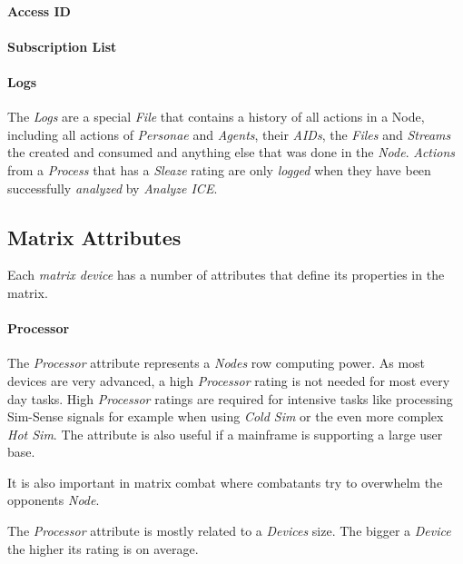\paragraph{Access ID}

\paragraph{Subscription List}

\paragraph{Logs}

The \emph{Logs} are a special \emph{File} that contains a history of all
actions in a Node, including all actions of \emph{Personae} and \emph{Agents},
their \emph{AIDs}, the \emph{Files} and \emph{Streams} the created and consumed
and anything else that was done in the \emph{Node}. \emph{Actions} from a
\emph{Process} that has a \emph{Sleaze} rating are only \emph{logged} when
they have been successfully \emph{analyzed} by \emph{Analyze ICE}.

\subsection{Matrix Attributes}

Each \emph{matrix device} has a number of attributes that define its properties in the matrix.

\paragraph{Processor}

The \emph{Processor} attribute represents a \emph{Nodes} row computing power. As most
devices are very advanced, a high \emph{Processor} rating is not needed for most every
day tasks. High \emph{Processor} ratings are required for intensive tasks like processing
Sim-Sense signals for example when using \emph{Cold Sim} or the even more complex
\emph{Hot Sim}. The attribute is also useful if a mainframe is supporting a large
user base.

It is also important in matrix combat where combatants try to overwhelm
the opponents \emph{Node}.

\hfill

The \emph{Processor} attribute is mostly related to a \emph{Devices} size. The
bigger a \emph{Device} the higher its rating is on average.


